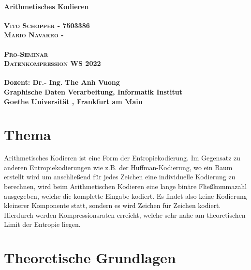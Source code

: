 \documentclass[a4paper]{article}
\theoremstyle{definition}
\theoremstyle{remark}
\begin{document}
	\begin{titlepage}
	
	\begin{center}

		\huge \textbf{\textsf{
		\\Arithmetisches Kodieren}} \\
		\LARGE\textbf{\textsc{\\
		Vito Schopper - 7503386
		\\
		Mario Navarro - }}\\ 
		\vspace{2cm}
		\LARGE\textbf{\textsc{\\Pro-Seminar
		\\ Datenkompression WS 2022}}\\ 
		\vspace{2.5cm}
		\large \textbf{
		\\
				Dozent: {Dr.- Ing. The Anh Vuong} \\
Graphische Daten Verarbeitung, Informatik Institut
\\
Goethe Universität , Frankfurt am Main
}
	\end{center}

\end{titlepage}
\tableofcontents\newpage
	
\section{Thema}
\label{sec:Thema}
Arithmetisches Kodieren ist eine Form der Entropiekodierung. Im Gegensatz zu anderen Entropiekodierungen wie z.B. der Huffman-Kodierung, wo ein Baum erstellt wird um anschließend für jedes Zeichen eine individuelle Kodierung zu berechnen, wird beim Arithmetischen Kodieren eine lange binäre Fließkommazahl ausgegeben, welche die komplette Eingabe kodiert. Es findet also keine Kodierung kleinerer Komponente statt, sondern es wird Zeichen für Zeichen kodiert. Hierdurch werden Kompressionsraten erreicht, welche sehr nahe am theoretischen Limit der Entropie liegen.\cite{WIKI}
		\section{Theoretische Grundlagen}

	\newpage
\end{document}
